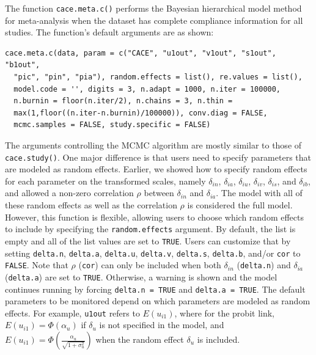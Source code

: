 The function \texttt{cace.meta.c()} performs the Bayesian hierarchical model method for meta-analysis when the dataset has complete compliance information for all studies. The function's default arguments are as shown:

\begin{verbatim}
cace.meta.c(data, param = c("CACE", "u1out", "v1out", "s1out", "b1out", 
  "pic", "pin", "pia"), random.effects = list(), re.values = list(), 
  model.code = '', digits = 3, n.adapt = 1000, n.iter = 100000,
  n.burnin = floor(n.iter/2), n.chains = 3, n.thin =
  max(1,floor((n.iter-n.burnin)/100000)), conv.diag = FALSE, 
  mcmc.samples = FALSE, study.specific = FALSE)
\end{verbatim}

\noindent The arguments controlling the MCMC algorithm are mostly similar to those of \texttt{cace.study()}. One major difference is that users need to specify parameters that are modeled as random effects. Earlier, we showed how to specify random effects for each parameter on the transformed scales, namely \(\delta_{in}\), \(\delta_{ia}\), \(\delta_{iu}\), \(\delta_{iv}\), \(\delta_{is}\), and \(\delta_{ib}\), and allowed a non-zero correlation \(\rho\) between \(\delta_{in}\) and \(\delta_{ia}\). The model with all of these random effects as well as the correlation \(\rho\) is considered the full model. However, this function is flexible, allowing users to choose which random effects to include by specifying the \texttt{random.effects} argument. By default, the list is empty and all of the list values are set to \texttt{TRUE}. Users can customize that by setting \texttt{delta.n}, \texttt{delta.a}, \texttt{delta.u}, \texttt{delta.v}, \texttt{delta.s}, \texttt{delta.b}, and/or \texttt{cor} to \texttt{FALSE}.
Note that \(\rho\) (\texttt{cor}) can only be included when both \(\delta_{in}\) (\texttt{delta.n}) and \(\delta_{ia}\) (\texttt{delta.a}) are set to \texttt{TRUE}. Otherwise, a warning is shown and the model continues running by forcing \texttt{delta.n\ =\ TRUE} and \texttt{delta.a\ =\ TRUE}.
The default parameters to be monitored depend on which parameters are modeled as random effects. For example, \texttt{u1out} refers to \(E(u_{i1})\), where for the probit link, \(E(u_{i1})=\Phi({\alpha_u})\) if \(\delta_u\) is not specified in the model, and \(E(u_{i1})=\Phi(\frac{\alpha_u}{\sqrt{1+{\sigma}^2_u}})\) when the random effect \(\delta_u\) is included.

